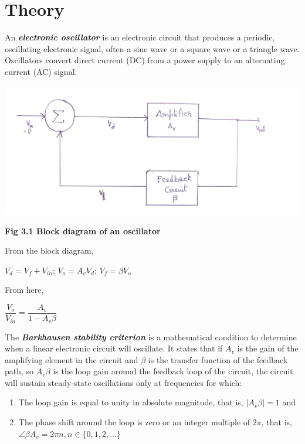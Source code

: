 \section{Theory}
\noindent An \textbf{\emph{electronic oscillator}} is an electronic circuit that produces a periodic, oscillating electronic signal, often a sine wave or a square wave or a triangle wave. Oscillators convert direct current (DC) from a power supply to an alternating current (AC) signal. 
\begin{center}
    \includegraphics[scale = 0.22]{Documents/block.jpg}
\end{center}
\begin{center}
    \textbf{Fig 3.1 Block diagram of an oscillator}
\end{center}
\noindent
From the block diagram, 
\begin{center}
    $V_d = V_f + V_{in}$; $V_o = A_v V_d$; $V_f = \beta V_o$
\end{center}
\noindent From here, 
\begin{center}
    $\dfrac{V_o}{V_{in}} = \dfrac{A_v}{1 - A_v \beta }$
\end{center}
\par
\noindent
The \textbf{\emph{Barkhausen stability criterion}} is a mathematical condition to determine when a linear electronic circuit will oscillate. It states that if $A_v$ is the gain of the amplifying element in the circuit and $\beta$ is the transfer function of the feedback path, so $A_v \beta$ is the loop gain around the feedback loop of the circuit, the circuit will sustain steady-state oscillations only at frequencies for which:
\begin{enumerate}
    \item The loop gain is equal to unity in absolute magnitude, that is, $|A_v \beta| = 1$ and
    \item The phase shift around the loop is zero or an integer multiple of $2 \pi$, that is, $\angle \beta A_v = 2 \pi n, n \in \{0, 1, 2, ...\}$
\end{enumerate}
